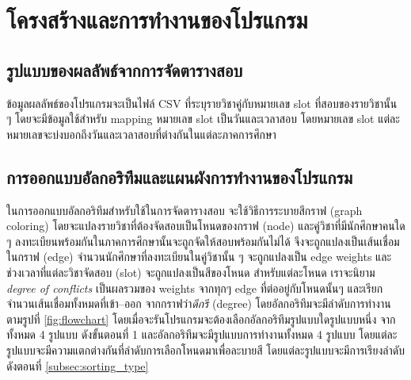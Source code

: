 \section{โครงสร้างและการทำงานของโปรแกรม}

\subsection{รูปแบบของผลลัพธ์จากการจัดตารางสอบ}
ข้อมูลผลลัพธ์ของโปรแกรมจะเป็นไฟล์ CSV ที่ระบุรายวิชาคู่กับหมายเลข slot ที่สอบของรายวิชานั้น ๆ โดยจะมีข้อมูลใช้สำหรับ mapping หมายเลข slot เป็นวันและเวลาสอบ
โดยหมายเลข slot แต่ละหมายเลขจะบ่งบอกถึงวันและเวลาสอบที่ต่างกันในแต่ละภาคการศึกษา

\subsection{การออกแบบอัลกอริทึมและแผนผังการทำงานของโปรแกรม}
ในการออกแบบอัลกอริทึมสำหรับใช้ในการจัดตารางสอบ จะใช้วิธีการระบายสีกราฟ (graph coloring) 
โดยจะแปลงรายวิชาที่ต้องจัดสอบเป็นโหนดของกราฟ (node) 
และคู่วิชาที่มีนักศึกษาคนใด ๆ ลงทะเบียนพร้อมกันในภาคการศึกษานั้นจะถูกจัดให้สอบพร้อมกันไม่ได้ 
จึงจะถูกแปลงเป็นเส้นเชื่อมในกราฟ (edge) จำนวนนักศึกษาที่ลงทะเบียนในคู่วิชานั้น ๆ จะถูกแปลงเป็น edge weights
และช่วงเวลาที่แต่ละวิชาจัดสอบ (slot) จะถูกแปลงเป็นสีของโหนด
สำหรับแต่ละโหนด เราจะนิยาม \emph{degree of conflicts} เป็นผลรวมของ weights จากทุกๆ edge ที่ต่ออยู่กับโหนดนั้นๆ
และเรียกจำนวนเส้นเชื่อมทั้งหมดที่เข้า--ออก จากกราฟว่า\emph{ดีกรี} (degree) 
โดยอัลกอริทึมจะมีลำดับการทำงานตามรูปที่ \ref{fig:flowchart} 
โดยเมื่อจะรันโปรแกรมจะต้องเลือกอัลกอริทึมรูปแบบใดรูปแบบหนึ่ง จากทั้งหมด 4 รูปแบบ ดังขั้นตอนที่ 1
และอัลกอริทึมจะมีรูปแบบการทำงานทั้งหมด 4 รูปแบบ โดยแต่ละรูปแบบจะมีความแตกต่างกันที่ลำดับการเลือกโหนดมาเพื่อละบายสี
โดยแต่ละรูปแบบจะมีการเรียงลำดับ ดังตอนที่ \ref{subsec:sorting_type}

